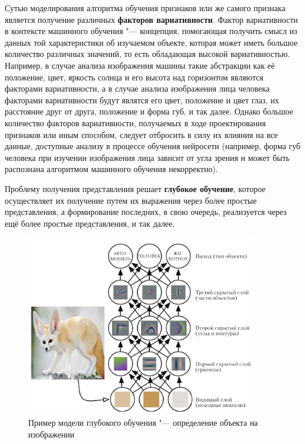 \documentclass[bachelor, och, coursework]{SCWorks}
\begin{document}
        Сутью моделирования алгоритма обучения признаков или же самого признака является получение различных \textbf{факторов вариативности}. Фактор вариативности в контексте машинного обучения "--- концепция, помогающая получить смысл из данных той характеристики об изучаемом объекте, которая может иметь большое количество различных значений, то есть обладающая высокой вариативностью. Например, в случае анализа изображения машины такие абстракции как её положение, цвет, яркость солнца и его высота над горизонтом являются факторами вариативности, а в случае анализа изображения лица человека факторами вариативности будут являтся его цвет, положение и цвет глаз, их расстояние друг от друга, положение и форма губ, и так далее. Однако большое количество факторов вариативности, получаемых в ходе проектирования признаков или иным способом, следует отбросить в силу их влияния на все данные, доступные анализу в процессе обучения нейросети (например, форма губ человека при изучении изображения лица зависит от угла зрения и может быть распознана алгоритмом машинного обучения некорректно).

        Проблему получения представления решает \textbf{глубокое обучение}, которое осуществляет их получение путем их выражения через более простые представления, а формирование последних, в свою очередь, реализуется через ещё более простые представления, и так далее.

        \begin{figure}[H]
            \centering
            \includegraphics[width=0.9\textwidth]{pic/1.png}
            \caption{Пример модели глубокого обучения "--- определение объекта на изображении}
            \label{fig:img1}
        \end{figure}
\end{document}

